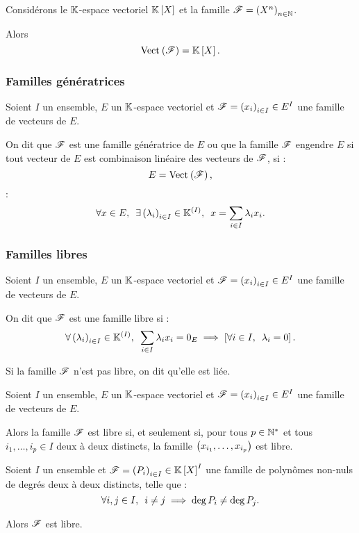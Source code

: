 \begin{ex}
Considérons le \(\mathbb{K}\)-espace vectoriel \(\poly\) et la famille \(\mathscr{F}=\left(X^n\right)_{n\in\mathbb{N}}\).

Alors \[\Vect{\fami{F}}=\poly.\]
\end{ex}

\subsubsection{Familles génératrices}

\begin{defi}
Soient \(I\) un ensemble, \(E\) un \(\mathbb{K}\)-espace vectoriel et \(\mathscr{F}=\left(x_i\right)_{i\in I}\in E^I\) une famille de vecteurs de \(E\).

On dit que \(\mathscr{F}\) est une famille génératrice de \(E\) ou que la famille \(\mathscr{F}\) engendre \(E\) si tout vecteur de \(E\) est combinaison linéaire des vecteurs de \(\mathscr{F}\), \cad si : \[E=\Vect{\fami{F}},\] \cad : \[\quantifs{\forall x\in E;\exists\paren{\lambda_i}_{i\in I}\in\K\deriv{I}}x=\sum_{i\in I}\lambda_ix_i.\]
\end{defi}

\subsubsection{Familles libres}

\begin{defi}
Soient \(I\) un ensemble, \(E\) un \(\mathbb{K}\)-espace vectoriel et \(\mathscr{F}=\left(x_i\right)_{i\in I}\in E^I\) une famille de vecteurs de \(E\).

On dit que \(\mathscr{F}\) est une famille libre si : \[\quantifs{\forall\paren{\lambda_i}_{i\in I}\in\K\deriv{I}}\sum_{i\in I}\lambda_ix_i=0_E\imp\croch{\quantifs{\forall i\in I}\lambda_i=0}.\]

Si la famille \(\mathscr{F}\) n'est pas libre, on dit qu'elle est liée.
\end{defi}

\begin{rem}
Soient \(I\) un ensemble, \(E\) un \(\mathbb{K}\)-espace vectoriel et \(\mathscr{F}=\left(x_i\right)_{i\in I}\in E^I\) une famille de vecteurs de \(E\).

Alors la famille \(\mathscr{F}\) est libre si, et seulement si, pour tous \(p\in\mathbb{N}^*\) et tous \(i_1,\dots,i_p\in I\) deux à deux distincts, la famille \(\left(x_{i_1},\dots,x_{i_p}\right)\) est libre.
\end{rem}

\begin{ex}
Soient \(I\) un ensemble et \(\fami{F}=\paren{P_i}_{i\in I}\in\poly^I\) une famille de polynômes non-nuls de degrés deux à deux distincts, \cad telle que : \[\quantifs{\forall i,j\in I}i\not=j\imp\deg P_i\not=\deg P_j.\]

Alors \(\mathscr{F}\) est libre.
\end{ex}

